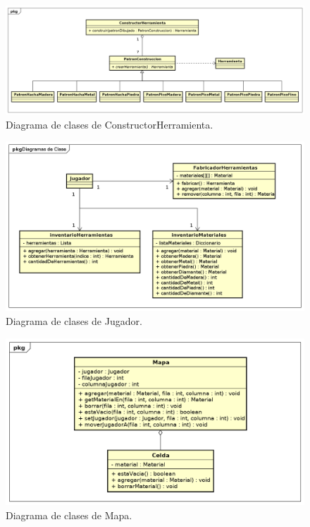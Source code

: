 \documentclass[titlepage,a4paper]{article}
\begin{document}
\begin{figure}[H]
\centering
\includegraphics[width=\textwidth]{Diagramas/ConstructorHerramienta.png}
\caption{\label{fig:constructor}Diagrama de clases de ConstructorHerramienta.}
\end{figure}

\begin{figure}[H]
\centering
\includegraphics[width=\textwidth]{Diagramas/Personaje.png}
\caption{\label{fig:jugador}Diagrama de clases de Jugador.}
\end{figure}

\begin{figure}[H]
\centering
\includegraphics[width=\textwidth]{Diagramas/Mapa.png}
\caption{\label{fig:mapa}Diagrama de clases de Mapa.}
\end{figure}
\end{document}

